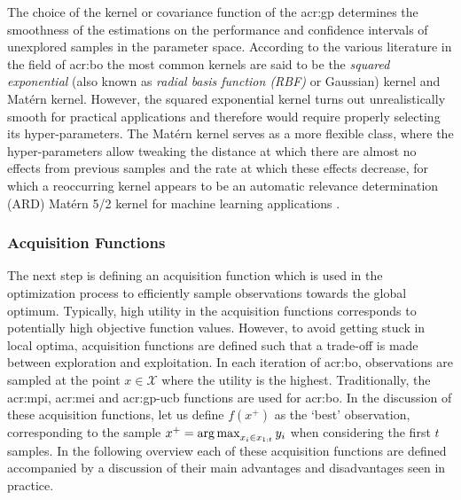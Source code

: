 The choice of the kernel or covariance function of the \acrshort{acr:gp} determines the smoothness of the estimations on the performance and confidence intervals of unexplored samples in the parameter space.
According to the various literature in the field of \acrlong{acr:bo} the most common kernels are said to be the \textit{squared exponential} (also known as \textit{radial basis function (RBF)} or Gaussian) kernel and Mat\'ern kernel.
However, the squared exponential kernel turns out unrealistically smooth for practical applications \cite{snoek2012practical} and therefore would require properly selecting its hyper-parameters.
The Mat\'ern kernel serves as a more flexible class, where the hyper-parameters allow tweaking the distance at which there are almost no effects from previous samples and the rate at which these effects decrease, for which a reoccurring kernel appears to be an automatic relevance determination (ARD) Mat\'ern 5/2 kernel for machine learning applications \cite{snoek2012practical, kawaguchi2015bayesian}.




\subsubsection*{Acquisition Functions}
\label{sec:bayesian-optimization-acquisition}
The next step is defining an acquisition function which is used in the optimization process to efficiently sample observations towards the global optimum.
Typically, high utility in the acquisition functions corresponds to potentially high objective function values.
However, to avoid getting stuck in local optima, acquisition functions are defined such that a trade-off is made between exploration and exploitation.
In each iteration of \acrlong{acr:bo}, observations are sampled at the point $x \in \mathcal{X}$ where the utility is the highest.
Traditionally, the \acrfull{acr:mpi}, \acrfull{acr:mei} and \acrfull{acr:gp-ucb} functions are used for \acrlong{acr:bo}.
In the discussion of these acquisition functions, let us define $f(x^+)$ as the `best' observation, corresponding to the sample $x^+ = \operatorname*{arg\,max}_{x_i \in x_{1:t}} y_i$ when considering the first $t$ samples.
In the following overview each of these acquisition functions are defined accompanied by a discussion of their main advantages and disadvantages seen in practice.

